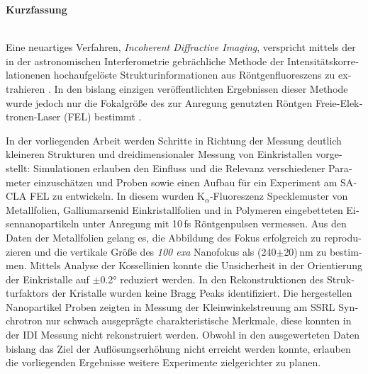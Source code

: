 \clearpage
 
 \begin{otherlanguage}{german}
 \begin{Huge}
 	\textbf{Kurzfassung}\vspace{12mm}
 \end{Huge}
\\
Eine neuartiges Verfahren, \textit{Incoherent Diffractive Imaging}, verspricht mittels der in der  astronomischen Interferometrie gebrächliche Methode der Intensitätskorrelationenen  hochaufgelöste Strukturinformationen aus Röntgenfluoreszens zu extrahieren \cite{classen2017}.  
In den bislang einzigen veröffentlichten Ergebnissen dieser Methode wurde jedoch nur  die Fokalgröße des zur Anregung genutzten Röntgen Freie-Elektronen-Laser (FEL) bestimmt \cite{nakumura2020}.

In der vorliegenden Arbeit werden Schritte in Richtung der Messung deutlich kleineren Strukturen und dreidimensionaler Messung von Einkristallen vorgestellt: Simulationen erlauben den Einfluss und die Relevanz verschiedener Parameter einzuschätzen und Proben sowie einen Aufbau für ein Experiment am SACLA FEL zu entwickeln.
In diesem wurden K$_\alpha$-Fluoreszenz Specklemuster von Metallfolien, Galliumarsenid Einkristallfolien und in Polymeren eingebetteten Eisennanopartikeln unter Anregung mit 10\,fs Röntgenpulsen vermessen. Aus den Daten der Metallfolien gelang es, die Abbildung des Fokus erfolgreich zu reproduzieren und die vertikale Größe des \textit{100 exa} Nanofokus als
(240$\pm$20)\,nm zu bestimmen. Mittels Analyse der Kossellinien konnte die Unsicherheit in der Orientierung der Einkristalle auf $\pm$0.2° reduziert werden. In den Rekonstruktionen des Strukturfaktors der Kristalle wurden keine Bragg Peaks identifiziert. Die hergestellen Nanopartikel Proben zeigten in Messung der Kleinwinkelstreuung am SSRL Synchrotron nur schwach ausgeprägte charakteristische Merkmale, diese konnten in der IDI Messung nicht rekonstruiert werden.
Obwohl in den ausgewerteten Daten bislang das Ziel der Auflösungserhöhung nicht erreicht werden konnte, erlauben die vorliegenden Ergebnisse weitere Experimente zielgerichter zu planen.
\end{otherlanguage}